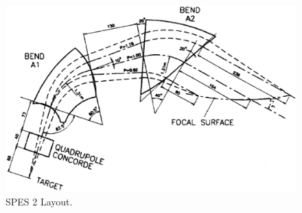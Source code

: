 \begin{figure}[H]
\centerline{\includegraphics[height=0.5\linewidth]{FigC1-1.eps}}
\caption{\label{figC11}SPES 2 Layout.}
\end{figure}

\vfill 

